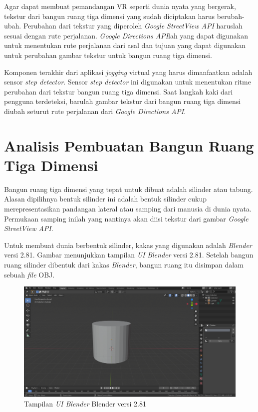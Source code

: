 Agar dapat membuat pemandangan VR seperti dunia nyata yang bergerak, tekstur dari bangun ruang tiga dimensi yang sudah diciptakan harus berubah-ubah. Perubahan dari tekstur yang diperoleh \textit{Google StreetView API} haruslah sesuai dengan rute perjalanan. \textit{Google Directions API}lah yang dapat digunakan untuk menentukan rute perjalanan dari asal dan tujuan yang dapat digunakan untuk perubahan gambar tekstur untuk bangun ruang tiga dimensi. 

Komponen terakhir dari aplikasi \textit{jogging} virtual yang harus dimanfaatkan adalah sensor \textit{step detector}. Sensor \textit{step detector} ini digunakan untuk menentukan ritme perubahan dari tekstur bangun ruang tiga dimensi. Saat langkah kaki dari pengguna terdeteksi, barulah gambar tekstur dari bangun ruang tiga dimensi diubah seturut rute perjalanan dari \textit{Google Directions API}.

\section{Analisis Pembuatan Bangun Ruang Tiga Dimensi}

Bangun ruang tiga dimensi yang tepat untuk dibuat adalah silinder atau tabung. Alasan dipilihnya bentuk silinder ini adalah bentuk silinder cukup merepresentasikan pandangan lateral atau samping dari manusia di dunia nyata. Permukaan samping inilah yang nantinya akan diisi tekstur dari gambar \textit{Google StreetView API}. 

Untuk membuat dunia berbentuk silinder, kakas yang digunakan adalah \textit{Blender} versi 2.81. Gambar menunjukkan tampilan \textit{UI} \textit{Blender} versi 2.81. Setelah bangun ruang silinder dibentuk dari kakas \textit{Blender}, bangun ruang itu disimpan dalam sebuah \textit{file} OBJ. 

\begin{figure}[h]
	\centering
		\includegraphics[scale=0.4]{Gambar/blender.png}
	\caption{Tampilan \textit{UI Blender} Blender versi 2.81}
	\label{fig:blender-ui}
\end{figure}


